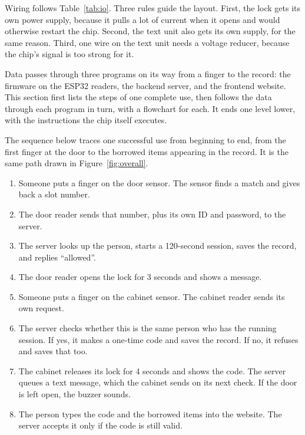 Wiring follows Table~\ref{tab:io}. Three rules guide the layout. First, the lock
gets its own power supply, because it pulls a lot of current when it opens and
would otherwise restart the chip. Second, the text unit also gets its own
supply, for the same reason. Third, one wire on the text unit needs a voltage
reducer, because the chip's signal is too strong for it.


Data passes through three programs on its way from a finger to the record: the
firmware on the ESP32 readers, the backend server, and the frontend website.
This section first lists the steps of one complete use, then follows the data
through each program in turn, with a flowchart for each. It ends one level
lower, with the instructions the chip itself executes.


The sequence below traces one successful use from beginning to end, from the
first finger at the door to the borrowed items appearing in the record. It is
the same path drawn in Figure~\ref{fig:overall}.

\begin{enumerate}
  \item Someone puts a finger on the door sensor. The sensor finds a match and
        gives back a slot number.
  \item The door reader sends that number, plus its own ID and password, to the
        server.
  \item The server looks up the person, starts a 120-second session, saves the
        record, and replies ``allowed''.
  \item The door reader opens the lock for 3 seconds and shows a message.
  \item Someone puts a finger on the cabinet sensor. The cabinet reader sends
        its own request.
  \item The server checks whether this is the same person who has the running
        session. If yes, it makes a one-time code and saves the record. If no,
        it refuses and saves that too.
  \item The cabinet releases its lock for 4 seconds and shows the code. The
        server queues a text message, which the cabinet sends on its next check.
        If the door is left open, the buzzer sounds.
  \item The person types the code and the borrowed items into the website. The
        server accepts it only if the code is still valid.
\end{enumerate}

